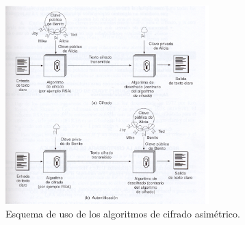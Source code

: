 \begin{figure}[!htbp]
    \centering
    \includegraphics[width=0.7\textwidth]{./Graphics/cifrado_esquema.png}
    \caption{\scriptsize Esquema de uso de los algoritmos de cifrado asimétrico.}
    \label{fig:Cipher}
\end{figure}

